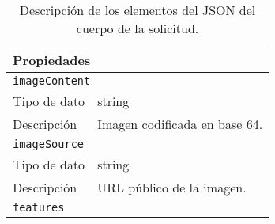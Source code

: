 \begin{table}[h!]
\caption{Descripción de los elementos del JSON del cuerpo de la solicitud.\label{tab:body_json_schema_request}}
\begin{tabular}{|l|l}
\hline
\multicolumn{2}{|l|}{\cellcolor[HTML]{68CBD0}\textbf{Propiedades}}                                                                                                                                                                                                      \\ \hline
\multicolumn{2}{|l|}{\cellcolor[HTML]{68CBD0}\texttt{imageContent}}                                                                                                                                                                                                       \\ \hline
Tipo de dato & \multicolumn{1}{l|}{string}                                                                                                                                                                                                      \\ \hline
Descripción  & \multicolumn{1}{l|}{Imagen codificada en base 64.}                                                                                                                                                                               \\ \hline
\multicolumn{2}{|l|}{\cellcolor[HTML]{68CBD0}\texttt{imageSource}}                                                                                                                                                                                                       \\ \hline
Tipo de dato & \multicolumn{1}{l|}{string}                                                                                                                                                                                                      \\ \hline
Descripción  & \multicolumn{1}{l|}{URL público de la imagen.}                                                                                                                                                                                   \\ \hline
\multicolumn{2}{|l|}{\texttt{features}}                                                                                                                                                                                      \\ \hline

\end{tabular}
\end{table}
